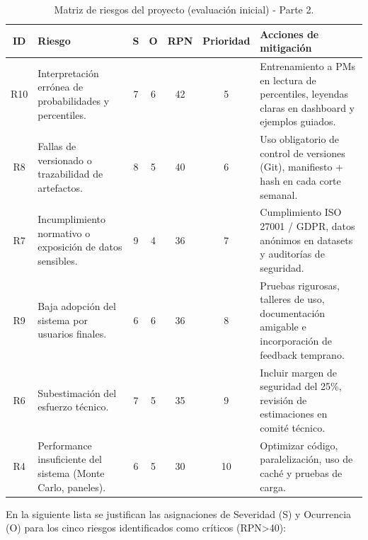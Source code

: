 \documentclass[12pt]
{charter}
\begin{document}
\begin{table}[ht]
\centering
\scriptsize
\caption{Matriz de riesgos del proyecto (evaluación inicial) - Parte 2.}
\label{tab:riesgos-b}
\begin{tabularx}{\textwidth}{cXccccX}
\toprule
\textbf{ID} & \textbf{Riesgo} & \textbf{S} & \textbf{O} & \textbf{RPN} & \textbf{Prioridad} & \textbf{Acciones de mitigación} \\
\midrule
R10 & Interpretación errónea de probabilidades y percentiles. & 7 & 6 & 42 & 5 &
Entrenamiento a PMs en lectura de percentiles, leyendas claras en dashboard y ejemplos guiados. \\
R8 & Fallas de versionado o trazabilidad de artefactos. & 8 & 5 & 40 & 6 &
Uso obligatorio de control de versiones (Git), manifiesto + hash en cada corte semanal. \\
R7 & Incumplimiento normativo o exposición de datos sensibles. & 9 & 4 & 36 & 7 &
Cumplimiento ISO 27001 / GDPR, datos anónimos en datasets y auditorías de seguridad. \\
R9 & Baja adopción del sistema por usuarios finales. & 6 & 6 & 36 & 8 &
Pruebas rigurosas, talleres de uso, documentación amigable e incorporación de feedback temprano. \\
R6 & Subestimación del esfuerzo técnico. & 7 & 5 & 35 & 9 &
Incluir margen de seguridad del 25\%, revisión de estimaciones en comité técnico. \\
R4 & Performance insuficiente del sistema (Monte Carlo, paneles). & 6 & 5 & 30 & 10 &
Optimizar código, paralelización, uso de caché y pruebas de carga. \\
\bottomrule
\end{tabularx}
\end{table}
\FloatBarrier

En la siguiente lista se justifican las asignaciones de Severidad (S) y Ocurrencia (O) para los cinco riesgos identificados como críticos (RPN>40):
\end{document}
